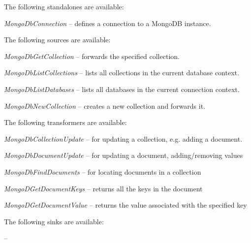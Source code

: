 \documentclass[a4paper]{book}
\begin{document}
The following standalones are available:
\begin{tight_itemize}
  \item \textit{MongoDbConnection} -- defines a connection to a MongoDB instance.
\end{tight_itemize}

The following sources are available:
\begin{tight_itemize}
  \item \textit{MongoDbGetCollection} -- forwards the specified collection.
  \item \textit{MongoDbListCollections} -- lists all collections in the current
  database context.
  \item \textit{MongoDbListDatabases} -- lists all databases in the current
  connection context.
  \item \textit{MongoDbNewCollection} -- creates a new collection and forwards it.
\end{tight_itemize}

The following transformers are available:
\begin{tight_itemize}
  \item \textit{MongoDbCollectionUpdate} -- for updating a collection, e.g. adding a document.
  \item \textit{MongoDbDocumentUpdate} -- for updating a document, adding/removing values
  \item \textit{MongoDbFindDocuments} -- for locating documents in a collection
  \item \textit{MongoDGetDocumentKeys} -- returns all the keys in the document
  \item \textit{MongoDGetDocumentValue} -- returns the value associated with the specified key
\end{tight_itemize}

The following sinks are available:
\begin{tight_itemize}
  \item \textit{} --
\end{tight_itemize}



\end{document}

